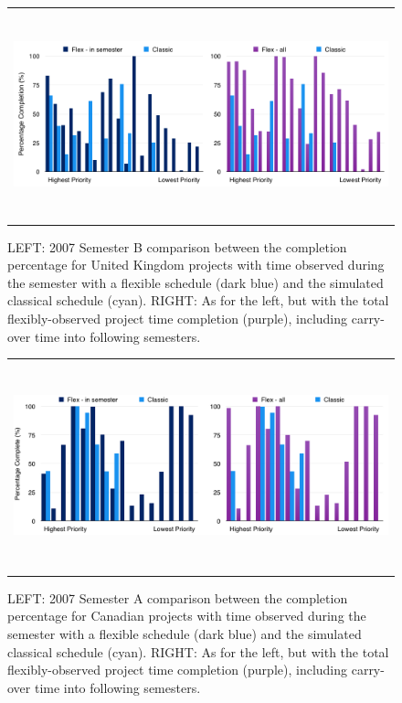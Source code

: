 \documentclass[]{spie}  %
\begin{document}
\begin{figure}[ht]
   \begin{center}
   \begin{tabular}{c}
   \includegraphics[height=6cm]{UK_2007B_flexvsclassic}
   \end{tabular}
   \end{center}
   \caption{\label{fig:cvf_uk} LEFT: 2007 Semester B comparison between the completion percentage for United Kingdom projects with time observed during the semester with a flexible schedule (dark blue) and the simulated classical schedule (cyan). RIGHT: As for the left, but with the total flexibly-observed project time completion (purple), including carry-over time into following semesters. }

\end{figure}
\begin{figure}
   \begin{center}
   \begin{tabular}{c}
   \includegraphics[height=6cm]{can_2007A_flexvsclassic}
   \end{tabular}
   \end{center}
   \caption{\label{fig:cvf_can}  LEFT: 2007 Semester A comparison between the completion percentage for Canadian projects with time observed during the semester with a flexible schedule (dark blue) and the simulated classical schedule (cyan). RIGHT: As for the left, but with the total flexibly-observed project time completion (purple), including carry-over time into following semesters. }
\end{figure}
\end{document}
